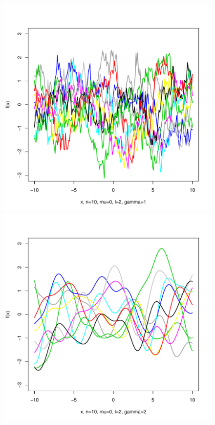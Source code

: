 \documentclass[12pt,letterpaper]{article}
\begin{document}
\begin{figure}
\begin{center}
\includegraphics[scale=0.2]{hw321/n10-m0-l2-g2.pdf}
\includegraphics[scale=0.2]{hw321/n10-m0-l2-g4.pdf}

\end{center}
\end{figure}
\end{document}
